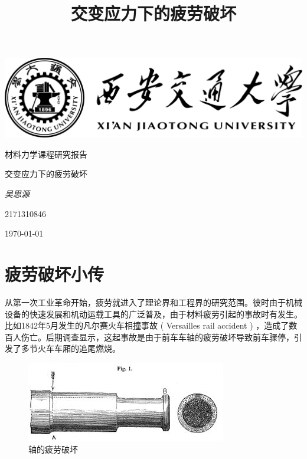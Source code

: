 \documentclass[12pt, a4paper]{ctexart}
\title{ 交变应力下的疲劳破坏}
\begin{document}
\begin{titlepage}
	\centering
	\includegraphics[width=1.0\textwidth]{./templates/logo.png}\par
	\vspace{2cm}
	{\kaishu\LARGE 材料力学课程研究报告\par}
	\vspace{1.5cm}
	{\fontsize{36pt}{\baselineskip} \heiti 交变应力下的疲劳破坏\par}
	\vspace{4cm}
	{\fangsong\Large\itshape 吴思源\par}
	\vspace{1cm}
	{2171310846}\par
	\vfill
	\vfill
	{\large \today\par}
\end{titlepage}
\maketitle
\section{疲劳破坏小传}

从第一次工业革命开始，疲劳就进入了理论界和工程界的研究范围。彼时由于机械设备的快速发展和机动运载工具的广泛普及，由于材料疲劳引起的事故时有发生。比如1842年5月发生的凡尔赛火车相撞事故 ( Versailles rail accident ) \citep{wiki:xxx}，造成了数百人伤亡。后期调查显示，这起事故是由于前车车轴的疲劳破坏导致前车骤停，引发了多节火车车厢的追尾燃烧。

\begin{figure}[ht]	
	\centering
	\includegraphics[scale=3.0]{31.jpg}
	\caption{轴的疲劳破坏}
	\label{fig:label}
\end{figure}
\end{document}
